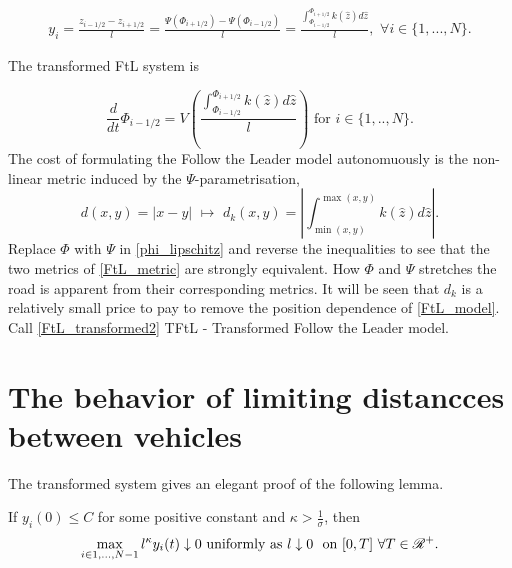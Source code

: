 \begin{align}
    y_i = \frac{z_{i-1/2} - z_{i+1/2}}{l} 
     = \frac{\Psi(\Phi_{i+1/2}) - \Psi(\Phi_{i-1/2})}{l}
     = \frac{\int_{\Phi_{i-1/2}}^{\Phi_{i+1/2}} k(\hat{z}) d \hat{z}}{l}, \, \, \forall i \in \{1,...,N\}.
\end{align}

The transformed FtL system is 

\begin{equation}\label{FtL_transformed2}  
   \frac{d}{dt} \Phi_{i-1/2}  = V\left(\frac{\int_{\Phi_{i-1/2}}^{\Phi_{i+1/2}} k(\hat{z}) d \hat{z}}{l}\right) \text{ for } i \in \{1,..,N\}.
\end{equation}
The cost of formulating the Follow the Leader model autonomuously is the non-linear metric induced by the $\Psi$-parametrisation, 
\begin{equation} \label{FtL_metric}
    d(x,y) = \left| x - y\right| \, \, \mapsto \, \, d_k(x,y) = \left|\int_{\min(x,y)}^{\max(x,y)} k(\hat{z}) d \hat{z}\right|.
\end{equation}
Replace $\Phi$ with $\Psi$ in \eqref{phi_lipschitz} and reverse the inequalities to see that the two metrics of \eqref{FtL_metric} are strongly equivalent. How $\Phi$ and $\Psi$ stretches the road is apparent from their corresponding metrics. It will be seen that $d_k$ is a relatively small price to pay to remove the position dependence of \eqref{FtL_model}. Call \ref{FtL_transformed2} TFtL - Transformed Follow the Leader model. 

\section{The behavior of limiting distancces between vehicles} \label{section:distance_cars}

The transformed system gives an elegant proof of the following lemma. 
\begin{lemma} \label{lemma:boundY}
	If $y_i(0) \leq C$ for some positive constant and $\kappa > \frac{1}{\sigma}$, then 
	\begin{equation}
		\max_{i \in {1,...,N-1}} l^\kappa y_i(t) \downarrow 0\text{ uniformly as } l \downarrow 0 \, \, \text{ on } [0,T] \,\, \forall T \in \mathscr{R}^+. 
	\end{equation}
\end{lemma}



